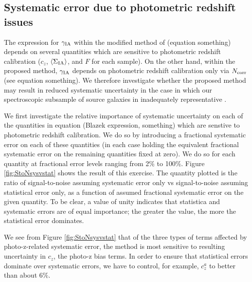 \documentclass[twocolumn,amsmath,aps,fleqn, superscriptaddress]{revtex4}
\begin{document}
\subsection{Systematic error due to photometric redshift issues}
\label{subsec:results_sys}
\noindent
The expression for $\gamma_{\rm IA}$ within the modified method of \cite{Blazek2012} (equation something) depends on several quantities which are sensitive to photometric redshift calibration ($c_z$, $\langle \Sigma_{\rm IA} \rangle$, and $F$ for each sample). On the other hand, within the proposed method, $\gamma_{\rm IA}$ depends on photometric redshift calibration only via $N_{\rm corr}$ (see equation something). We therefore investigate whether the proposed method may result in reduced systematic uncertainty in the case in which our spectroscopic subsample of source galaxies in inadequately representative . 

We first investigate the relative importance of systematic uncertainty on each of the quantities in equation (Blazek expression, something) which are senstive to photometric redshift calibration. We do so by introducing a fractional systematic error on each of these quantities (in each case holding the equivalent fractional systematic error on the remaining quantities fixed at zero). We do so for each quantity at fractional error levels ranging from 2\% to 100\%. Figure \ref{fig:StoNsysvstat} shows the result of this exercise. The quantity plotted is the ratio of signal-to-noise assuming systematic error only vs signal-to-noise assuming statistical error only, as a function of assumed fractional systematic error on the given quantity. To be clear, a value of unity indicates that statistica and systematic errors are of equal importance; the greater the value, the more the statistical error dominates.

We see from Figure \ref{fig:StoNsysvstat} that of the three types of terms affected by photo-z-related systematic error, the method is most sensitive to resulting uncertainty in $c_z$, the photo-z bias terms. In order to ensure that statistical errors dominate over systematic errors, we have to control, for example, $c_z^a$ to better than about $6\%$. 
\end{document}

